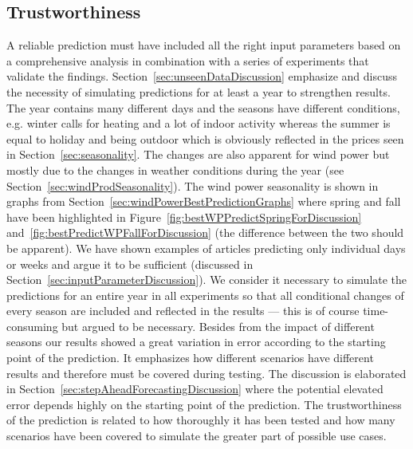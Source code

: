 
\subsection{Trustworthiness}
A reliable prediction must have included all the right input parameters based on a comprehensive analysis in combination with a series of experiments that validate the findings. Section~\ref{sec:unseenDataDiscussion} emphasize and discuss the necessity of simulating predictions for at least a year to strengthen results. The year contains many different days and the seasons have different conditions, e.g. winter calls for heating and a lot of indoor activity whereas the summer is equal to holiday and being outdoor which is obviously reflected in the prices seen in Section~\ref{sec:seasonality}. The changes are also apparent for wind power but mostly due to the changes in weather conditions during the year (see Section~\ref{sec:windProdSeasonality}). The wind power seasonality is shown in graphs from Section~\ref{sec:windPowerBestPredictionGraphs} where spring and fall have been highlighted in Figure~\ref{fig:bestWPPredictSpringForDiscussion} and~\ref{fig:bestPredictWPFallForDiscussion} (the difference between the two should be apparent). We have shown examples of articles predicting only individual days or weeks and argue it to be sufficient (discussed in Section~\ref{sec:inputParameterDiscussion}). We consider it necessary to simulate the predictions for an entire year in all experiments so that all conditional changes of every season are included and reflected in the results --- this is of course time-consuming but argued to be necessary. Besides from the impact of different seasons our results showed a great variation in error according to the starting point of the prediction. It emphasizes how different scenarios have different results and therefore must be covered during testing. The discussion is elaborated in Section~\ref{sec:stepAheadForecastingDiscussion} where the potential elevated error depends highly on the starting point of the prediction. The trustworthiness of the prediction is related to how thoroughly it has been tested and how many scenarios have been covered to simulate the greater part of possible use cases. 

